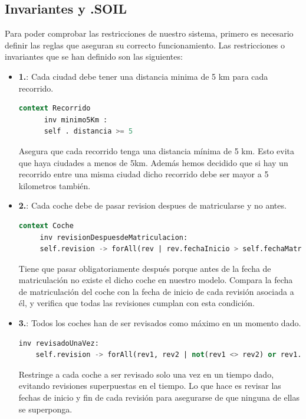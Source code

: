 \documentclass[12pt.a4paper]{article}
\begin{document}
\subsection{Invariantes y .SOIL}
Para poder comprobar las restricciones de nuestro sistema, primero es necesario definir las reglas que aseguran su correcto funcionamiento. Las restricciones o invariantes que se han definido son las siguientes:

\begin{itemize}
    \item \textbf{1.}: Cada ciudad debe tener una distancia minima de 5 km para cada recorrido.
    \begin{lstlisting}[style = useEspecifico,language=SQL]
    context Recorrido
      inv minimo5Km :
      self . distancia >= 5
    \end{lstlisting}
    Asegura que cada recorrido tenga una distancia mínima de 5 km. Esto evita que haya ciudades a menos de 5km. Además hemos decidido que si hay un recorrido entre una misma ciudad dicho recorrido debe ser mayor a 5 kilometros también.
    
    \item \textbf{2.}: Cada coche debe de pasar revision despues de matricularse y no antes.
    \begin{lstlisting}[style = useEspecifico,language=SQL]
   context Coche
     inv revisionDespuesdeMatriculacion:
     self.revision -> forAll(rev | rev.fechaInicio > self.fechaMatriculacion)
    \end{lstlisting}
    Tiene que pasar obligatoriamente después porque antes de la fecha de matriculación no existe el dicho coche en nuestro modelo.
    Compara la fecha de matriculación del coche con la fecha de inicio de cada revisión asociada a él, y verifica que todas las revisiones cumplan con esta condición. 
    
    \item \textbf{3.}: Todos los coches han de ser revisados como máximo en un momento dado.
    \begin{lstlisting}[style = useEspecifico,language=SQL]
    inv revisadoUnaVez:
    self.revision -> forAll(rev1, rev2 | not(rev1 <> rev2) or rev1.fechaInicio <> rev2.fechaInicio and (rev1.fechaInicio >= rev2.fechaFin or rev2.fechaInicio >= rev1.fechaFin))
    \end{lstlisting}
    Restringe a cada coche a ser revisado solo una vez en un tiempo dado, evitando revisiones superpuestas en el tiempo.
    Lo que hace es revisar las fechas de inicio y fin de cada revisión para asegurarse de que ninguna de ellas se superponga.
    

\end{itemize}
\end{document}
